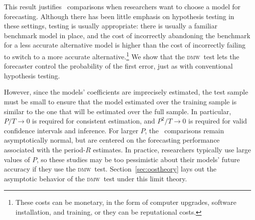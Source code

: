 \documentclass[11pt]{article}
\newcommand{\dmw}{\textsc{dmw}}
\begin{document}
This result justifies \oos\ comparisons when researchers want to
choose a model for forecasting.  Although there has been little
emphasis on hypothesis testing in these settings, testing is usually
appropriate: there is usually a familiar benchmark model in place, and
the cost of incorrectly abandoning the benchmark for a less accurate
alternative model is higher than the cost of incorrectly failing to
switch to a more accurate alternative.\footnote{These costs can be
  monetary, in the form of computer upgrades, software installation,
  and training, or they can be reputational costs.}
We show that the \dmw\ test lets the forecaster control the
probability of the first error, just as with conventional hypothesis
testing.  

However, since the models' coefficients are imprecisely
estimated, the test sample must be small to ensure that the model
estimated over the training sample is similar to the one that will be
estimated over the full sample.  In particular, $P/T \to 0$ is
required for consistent estimation, and $P^2/T \to 0$ is required for
valid confidence intervals and inference.  For larger $P$, the \oos\
comparisons remain asymptotically normal, but are centered on the
forecasting performance associated with the period-$R$ estimates.  In
practice, researchers typically use large values of $P$, so these
studies may be too pessimistic about their models' future accuracy if
they use the \dmw\ test.  Section~\ref{sec:oostheory} lays out the
asymptotic behavior of the \dmw\ test under this limit theory.
\end{document}
